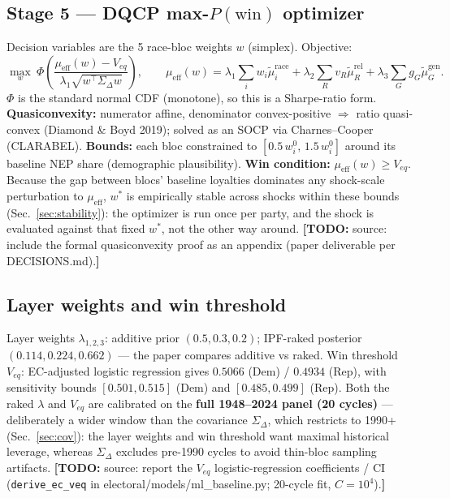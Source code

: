 \documentclass[11pt]{article}
\newcommand{\todo}[1]{{\color{red}\textbf{[TODO:} #1\textbf{]}}}
\begin{document}
\subsection{Stage 5 --- DQCP max-$P(\text{win})$ optimizer}
Decision variables are the 5 race-bloc weights $w$ (simplex). Objective:
\[
\max_{w}\ \Phi\!\left(\frac{\mu_{\text{eff}}(w)-V_{eq}}
{\lambda_1\sqrt{w^{\top}\Sigma_\Delta w}}\right),
\qquad
\mu_{\text{eff}}(w)=\lambda_1\!\sum_i w_i\tilde\mu_i^{\text{race}}
+\lambda_2\!\sum_R v_R\tilde\mu_R^{\text{rel}}
+\lambda_3\!\sum_G g_G\tilde\mu_G^{\text{gen}} .
\]
$\Phi$ is the standard normal CDF (monotone), so this is a Sharpe-ratio form.
\textbf{Quasiconvexity:} numerator affine, denominator convex-positive
$\Rightarrow$ ratio quasi-convex (Diamond \& Boyd 2019); solved as an SOCP via
Charnes--Cooper (CLARABEL). \textbf{Bounds:} each bloc constrained to
$[0.5\,w^0_i,\,1.5\,w^0_i]$ around its baseline NEP share (demographic
plausibility). \textbf{Win condition:} $\mu_{\text{eff}}(w)\ge V_{eq}$.
Because the gap between blocs' baseline loyalties dominates any shock-scale
perturbation to $\mu_{\text{eff}}$, $w^{*}$ is empirically stable across
shocks within these bounds (Sec.~\ref{sec:stability}): the optimizer is run
once per party, and the shock is evaluated against that fixed $w^{*}$, not
the other way around.
\todo{source: include the formal quasiconvexity proof as an appendix
(paper deliverable per DECISIONS.md).}

\subsection{Layer weights and win threshold}
Layer weights $\lambda_{1,2,3}$: additive prior $(0.5,0.3,0.2)$; IPF-raked
posterior $(0.114,0.224,0.662)$ --- the paper compares additive vs raked. Win
threshold $V_{eq}$: EC-adjusted logistic regression gives $0.5066$ (Dem) /
$0.4934$ (Rep), with sensitivity bounds $[0.501,0.515]$ (Dem) and
$[0.485,0.499]$ (Rep).
Both the raked $\lambda$ and $V_{eq}$ are calibrated on the \textbf{full
1948--2024 panel (20 cycles)} --- deliberately a wider window than the
covariance $\Sigma_\Delta$, which restricts to 1990+ (Sec.~\ref{sec:cov}): the
layer weights and win threshold want maximal historical leverage, whereas
$\Sigma_\Delta$ excludes pre-1990 cycles to avoid thin-bloc sampling artifacts.
\todo{source: report the $V_{eq}$ logistic-regression coefficients / CI
(\texttt{derive\_ec\_veq} in electoral/models/ml\_baseline.py; 20-cycle fit,
$C{=}10^4$).}
\end{document}
